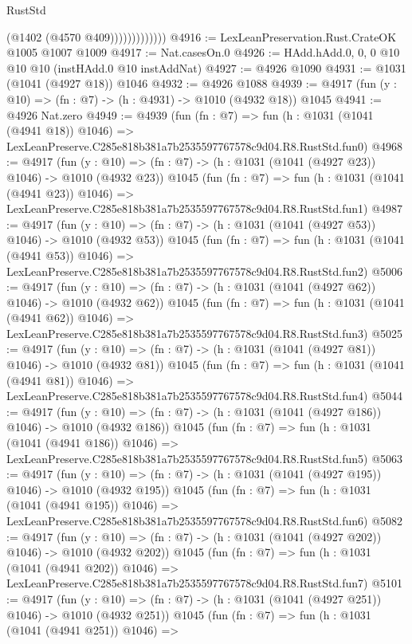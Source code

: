\begin{lexlean}{RustStd}
\begin{coremodule}
                          (@1402 (@4570 @409)))))))))))))
@4916 := LexLeanPreservation.Rust.CrateOK @1005 @1007 @1009
@4917 := Nat.casesOn.{0}
@4926 := HAdd.hAdd.{0, 0, 0} @10 @10 @10 (instHAdd.{0} @10 instAddNat)
@4927 := @4926 @1090
@4931 := @1031 (@1041 (@4927 @18)) @1046
@4932 := @4926 @1088
@4939 := @4917 (fun (y : @10) => (fn : @7) -> (h : @4931) -> @1010 (@4932 @18)) @1045
@4941 := @4926 Nat.zero
@4949 := @4939
    (fun (fn : @7) =>
    fun (h : @1031 (@1041 (@4941 @18)) @1046) =>
    LexLeanPreserve.C285e818b381a7b2535597767578c9d04.R8.RustStd.fun0)
@4968 := @4917
    (fun (y : @10) => (fn : @7) -> (h : @1031 (@1041 (@4927 @23)) @1046) -> @1010 (@4932 @23))
    @1045
    (fun (fn : @7) =>
    fun (h : @1031 (@1041 (@4941 @23)) @1046) =>
    LexLeanPreserve.C285e818b381a7b2535597767578c9d04.R8.RustStd.fun1)
@4987 := @4917
    (fun (y : @10) => (fn : @7) -> (h : @1031 (@1041 (@4927 @53)) @1046) -> @1010 (@4932 @53))
    @1045
    (fun (fn : @7) =>
    fun (h : @1031 (@1041 (@4941 @53)) @1046) =>
    LexLeanPreserve.C285e818b381a7b2535597767578c9d04.R8.RustStd.fun2)
@5006 := @4917
    (fun (y : @10) => (fn : @7) -> (h : @1031 (@1041 (@4927 @62)) @1046) -> @1010 (@4932 @62))
    @1045
    (fun (fn : @7) =>
    fun (h : @1031 (@1041 (@4941 @62)) @1046) =>
    LexLeanPreserve.C285e818b381a7b2535597767578c9d04.R8.RustStd.fun3)
@5025 := @4917
    (fun (y : @10) => (fn : @7) -> (h : @1031 (@1041 (@4927 @81)) @1046) -> @1010 (@4932 @81))
    @1045
    (fun (fn : @7) =>
    fun (h : @1031 (@1041 (@4941 @81)) @1046) =>
    LexLeanPreserve.C285e818b381a7b2535597767578c9d04.R8.RustStd.fun4)
@5044 := @4917
    (fun (y : @10) => (fn : @7) -> (h : @1031 (@1041 (@4927 @186)) @1046) -> @1010 (@4932 @186))
    @1045
    (fun (fn : @7) =>
    fun (h : @1031 (@1041 (@4941 @186)) @1046) =>
    LexLeanPreserve.C285e818b381a7b2535597767578c9d04.R8.RustStd.fun5)
@5063 := @4917
    (fun (y : @10) => (fn : @7) -> (h : @1031 (@1041 (@4927 @195)) @1046) -> @1010 (@4932 @195))
    @1045
    (fun (fn : @7) =>
    fun (h : @1031 (@1041 (@4941 @195)) @1046) =>
    LexLeanPreserve.C285e818b381a7b2535597767578c9d04.R8.RustStd.fun6)
@5082 := @4917
    (fun (y : @10) => (fn : @7) -> (h : @1031 (@1041 (@4927 @202)) @1046) -> @1010 (@4932 @202))
    @1045
    (fun (fn : @7) =>
    fun (h : @1031 (@1041 (@4941 @202)) @1046) =>
    LexLeanPreserve.C285e818b381a7b2535597767578c9d04.R8.RustStd.fun7)
@5101 := @4917
    (fun (y : @10) => (fn : @7) -> (h : @1031 (@1041 (@4927 @251)) @1046) -> @1010 (@4932 @251))
    @1045
    (fun (fn : @7) =>
    fun (h : @1031 (@1041 (@4941 @251)) @1046) =>

\end{coremodule}
\end{lexlean}
